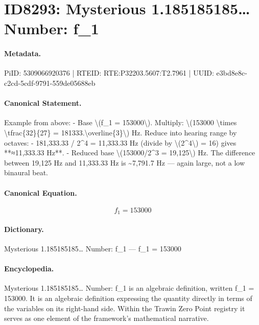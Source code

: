 \section*{ID8293: Mysterious 1.185185185… Number: f\_1}
\paragraph{Metadata.}
PiID: 5309066920376 | RTEID: RTE:P32203.5607:T2.7961 | UUID: e3bd8e8c-c2cd-5cdf-9791-559de05688eb

\paragraph{Canonical Statement.}
Example from above: - Base \textbackslash{}(f\_1 = 153000\textbackslash{}). Multiply: \textbackslash{}(153000 \textbackslash{}times \textbackslash{}tfrac\{32\}\{27\} = 181333.\textbackslash{}overline\{3\}\textbackslash{}) Hz. Reduce into hearing range by octaves: - 181,333.33 / 2\textasciicircum{}4 = 11,333.33 Hz (divide by \textbackslash{}(2\textasciicircum{}4\textbackslash{}) = 16) gives **≈11,333.33 Hz**. - Reduced base \textbackslash{}(153000/2\textasciicircum{}3 = 19,125\textbackslash{}) Hz. The difference between 19,125 Hz and 11,333.33 Hz is \textasciitilde{}7,791.7 Hz — again large, not a low binaural beat.

\paragraph{Canonical Equation.}
\[
f_1 = 153000
\]

\paragraph{Dictionary.}
Mysterious 1.185185185… Number: f\_1 — f\_1 = 153000

\paragraph{Encyclopedia.}
Mysterious 1.185185185… Number: f\_1 is an algebraic definition, written f\_1 = 153000. It is an algebraic definition expressing the quantity directly in terms of the variables on its right-hand side. Within the Trawin Zero Point registry it serves as one element of the framework's mathematical narrative.
